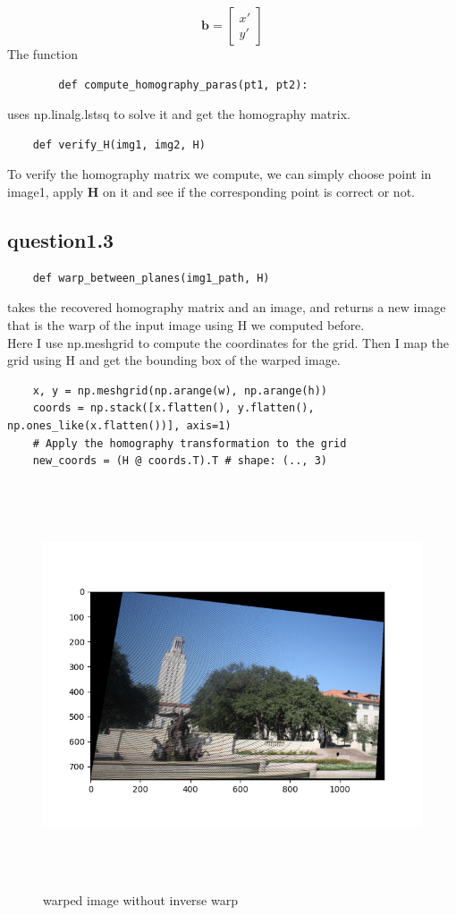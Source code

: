\documentclass[a4paper,UTF8]{article}
\numberwithin{equation}{section}
\begin{document}
$$\textbf{b}=\begin{bmatrix}
		x' \\
		y'
	\end{bmatrix}$$
The function
\begin{lstlisting}
		def compute_homography_paras(pt1, pt2):
\end{lstlisting}
uses np.linalg.lstsq to solve it and get the homography matrix.
\begin{lstlisting}
	def verify_H(img1, img2, H)
\end{lstlisting}
To verify the homography matrix we compute, we can simply choose point in image1, apply $\textbf{H}$ on it and see if the corresponding point is correct or not.

\subsection{question1.3}
\begin{lstlisting}
	def warp_between_planes(img1_path, H)
\end{lstlisting}
takes the recovered homography matrix and an image, and returns a new image that is the warp of the input image using H we computed before. \\
Here I use np.meshgrid to compute the coordinates for the grid. Then I map the grid using H and get the bounding box of the warped image.
\begin{lstlisting}
	x, y = np.meshgrid(np.arange(w), np.arange(h))
	coords = np.stack([x.flatten(), y.flatten(), np.ones_like(x.flatten())], axis=1)
	# Apply the homography transformation to the grid
    new_coords = (H @ coords.T).T # shape: (.., 3)
\end{lstlisting}
\begin{figure}[H]
	\centering  %
	\includegraphics[width=12cm,height=12cm]{warped_img_without_inverse_warp.png}  %
	\caption{warped image without inverse warp}  %
\end{figure}
\end{document}
